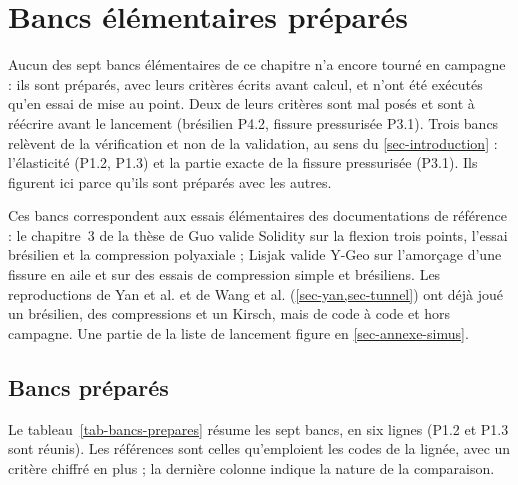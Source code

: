 \section{Bancs élémentaires préparés}
\label{sec-validation}

Aucun des sept bancs élémentaires de ce chapitre n'a encore tourné en campagne : ils sont préparés, avec leurs critères écrits avant calcul, et n'ont été exécutés qu'en essai de mise au point. Deux de leurs critères sont mal posés et sont à réécrire avant le lancement (brésilien P4.2, fissure pressurisée P3.1). Trois bancs relèvent de la vérification et non de la validation, au sens du \cref{sec-introduction} : l'élasticité (P1.2, P1.3) et la partie exacte de la fissure pressurisée (P3.1). Ils figurent ici parce qu'ils sont préparés avec les autres.

Ces bancs correspondent aux essais élémentaires des documentations de référence : le chapitre~3 de la thèse de Guo valide Solidity sur la flexion trois points, l'essai brésilien et la compression polyaxiale ; Lisjak valide Y-Geo sur l'amorçage d'une fissure en aile et sur des essais de compression simple et brésiliens. Les reproductions de Yan et al. et de Wang et al. (\cref{sec-yan,sec-tunnel}) ont déjà joué un brésilien, des compressions et un Kirsch, mais de code à code et hors campagne. Une partie de la liste de lancement figure en \cref{sec-annexe-simus}.

\subsection{Bancs préparés}

Le tableau~\ref{tab-bancs-prepares} résume les sept bancs, en six lignes (P1.2 et P1.3 sont réunis). Les références sont celles qu'emploient les codes de la lignée, avec un critère chiffré en plus ; la dernière colonne indique la nature de la comparaison.

